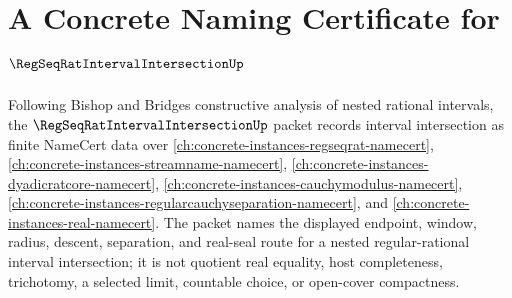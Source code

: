 \chapter{A Concrete Naming Certificate for $\RegSeqRatIntervalIntersectionUp$}
\label{ch:concrete-instances-regseqrat-interval-intersection-namecert}

Following Bishop and Bridges constructive analysis of nested rational intervals, the $\RegSeqRatIntervalIntersectionUp$ packet records interval intersection as finite NameCert data over \autoref{ch:concrete-instances-regseqrat-namecert}, \autoref{ch:concrete-instances-streamname-namecert}, \autoref{ch:concrete-instances-dyadicratcore-namecert}, \autoref{ch:concrete-instances-cauchymodulus-namecert}, \autoref{ch:concrete-instances-regularcauchyseparation-namecert}, and \autoref{ch:concrete-instances-real-namecert}. The packet names the displayed endpoint, window, radius, descent, separation, and real-seal route for a nested regular-rational interval intersection; it is not quotient real equality, host completeness, trichotomy, a selected limit, countable choice, or open-cover compactness.

